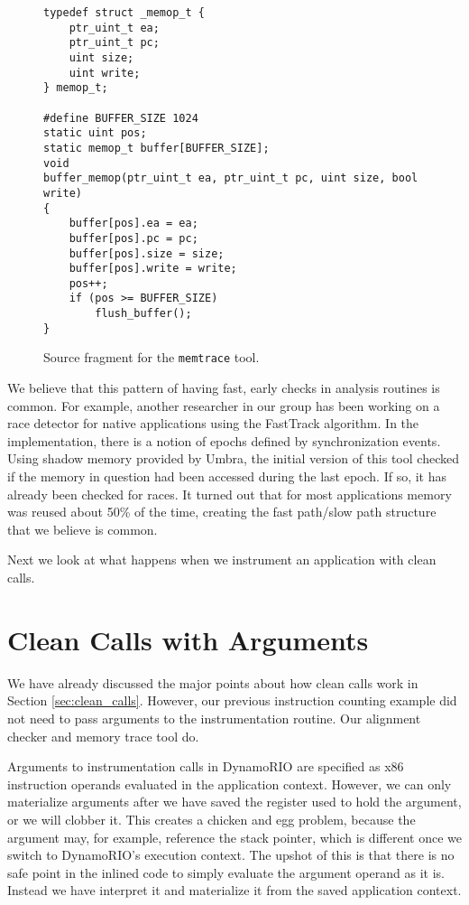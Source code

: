 \begin{figure}
\begin{verbatim}
typedef struct _memop_t {
    ptr_uint_t ea;
    ptr_uint_t pc;
    uint size;
    uint write;
} memop_t;

#define BUFFER_SIZE 1024
static uint pos;
static memop_t buffer[BUFFER_SIZE];
void
buffer_memop(ptr_uint_t ea, ptr_uint_t pc, uint size, bool write)
{
    buffer[pos].ea = ea;
    buffer[pos].pc = pc;
    buffer[pos].size = size;
    buffer[pos].write = write;
    pos++;
    if (pos >= BUFFER_SIZE)
        flush_buffer();
}
\end{verbatim}
\caption{Source fragment for the {\tt memtrace} tool.}
\label{fig:memtrace_src}
\end{figure}

We believe that this pattern of having fast, early checks in analysis routines
is common.  For example, another researcher in our group has been working on a
race detector for native applications using the FastTrack
algorithm\cite{fasttrack}.  In the implementation, there is a notion of epochs
defined by synchronization events.  Using shadow memory provided by
Umbra\cite{umbra}, the initial version of this tool checked if the memory in
question had been accessed during the last epoch.  If so, it has already been
checked for races.  It turned out that for most applications memory was reused
about 50\% of the time, creating the fast path/slow path structure that we believe
is common.

Next we look at what happens when we instrument an application with clean calls.

\section{Clean Calls with Arguments}

We have already discussed the major points about how clean calls work in Section
\ref{sec:clean_calls}.  However, our previous instruction counting example did
not need to pass arguments to the instrumentation routine.  Our alignment
checker and memory trace tool do.

Arguments to instrumentation calls in DynamoRIO are specified as x86 instruction
operands evaluated in the application context.  However, we can only materialize
arguments after we have saved the register used to hold the argument, or we will
clobber it.  This creates a chicken and egg problem, because the argument may,
for example, reference the stack pointer, which is different once we switch to
DynamoRIO's execution context.  The upshot of this is that there is no safe
point in the inlined code to simply evaluate the argument operand as it is.
Instead we have interpret it and materialize it from the saved application
context.

